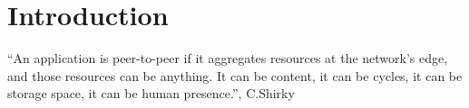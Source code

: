 
% 
% 

\section{Introduction}





  ``An application is peer-to-peer if it aggregates resources at the network’s edge, and those resources can be anything. It can be content, it can be cycles, it can be storage space, it can be human presence.'', C.Shirky \cite{Shirky.}


